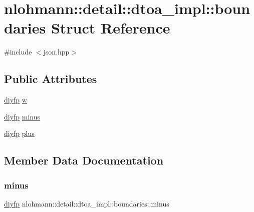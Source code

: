 \hypertarget{structnlohmann_1_1detail_1_1dtoa__impl_1_1boundaries}{}\section{nlohmann\+::detail\+::dtoa\+\_\+impl\+::boundaries Struct Reference}
\label{structnlohmann_1_1detail_1_1dtoa__impl_1_1boundaries}


{\ttfamily \#include $<$json.\+hpp$>$}

\subsection*{Public Attributes}
\begin{DoxyCompactItemize}
\item 
\mbox{\hyperlink{structnlohmann_1_1detail_1_1dtoa__impl_1_1diyfp}{diyfp}} \mbox{\hyperlink{structnlohmann_1_1detail_1_1dtoa__impl_1_1boundaries_ad1668c60aeade5f2557fafed8b8aee1a}{w}}
\item 
\mbox{\hyperlink{structnlohmann_1_1detail_1_1dtoa__impl_1_1diyfp}{diyfp}} \mbox{\hyperlink{structnlohmann_1_1detail_1_1dtoa__impl_1_1boundaries_aec4e5028333c01f3229062f31ce16763}{minus}}
\item 
\mbox{\hyperlink{structnlohmann_1_1detail_1_1dtoa__impl_1_1diyfp}{diyfp}} \mbox{\hyperlink{structnlohmann_1_1detail_1_1dtoa__impl_1_1boundaries_a3321ae2816a6ec5250a0d8e29f798232}{plus}}
\end{DoxyCompactItemize}


\subsection{Member Data Documentation}
\mbox{\label{structnlohmann_1_1detail_1_1dtoa__impl_1_1boundaries_aec4e5028333c01f3229062f31ce16763}} 
\subsubsection{\texorpdfstring{minus}{minus}}
{\footnotesize\ttfamily \mbox{\hyperlink{structnlohmann_1_1detail_1_1dtoa__impl_1_1diyfp}{diyfp}} nlohmann\+::detail\+::dtoa\+\_\+impl\+::boundaries\+::minus}

